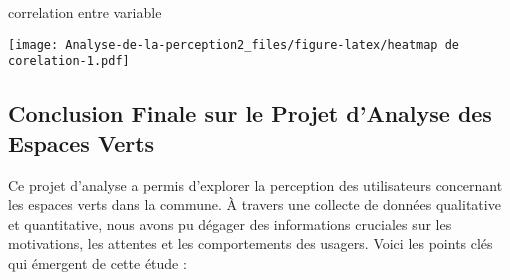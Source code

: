 \documentclass[
]{article}
\newenvironment{Shaded}{}{}
\newcommand{\AttributeTok}[1]{#1}
\newcommand{\StringTok}[1]{#1}
\begin{document}
\begin{Shaded}
\begin{Highlighting}[]
\StringTok{\textasciigrave{}}\AttributeTok{correlation entre variable}\StringTok{\textasciigrave{}}
\end{Highlighting}
\end{Shaded}

\texttt{[image: Analyse-de-la-perception2\_files/figure-latex/heatmap de corelation-1.pdf]}

\subsection{Conclusion Finale sur le Projet d'Analyse des Espaces
Verts}\label{conclusion-finale-sur-le-projet-danalyse-des-espaces-verts}

Ce projet d'analyse a permis d'explorer la perception des utilisateurs
concernant les espaces verts dans la commune. À travers une collecte de
données qualitative et quantitative, nous avons pu dégager des
informations cruciales sur les motivations, les attentes et les
comportements des usagers. Voici les points clés qui émergent de cette
étude :
\end{document}
